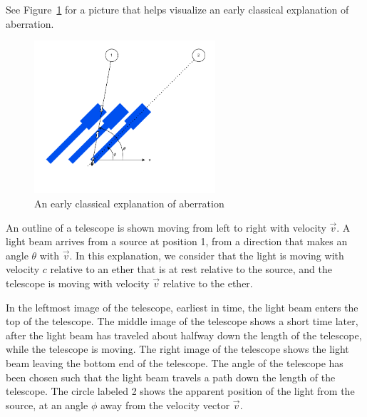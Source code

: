 \documentclass[a4paper]{article}
\theoremstyle{plain}
\theoremstyle{definition}
\newcommand{\vect}[1]{\vec{#1}}
\begin{document}
See Figure~\ref{fig:classical-aberration} for a picture that helps
visualize an early classical explanation of aberration.
\begin{figure}[ht]
	\centering
	\includegraphics[width=0.6\textwidth]{classical-aberration-cropped.pdf}
	\caption{An early classical explanation of aberration}
	\label{fig:classical-aberration}
\end{figure}

An outline of a telescope is shown moving from left to right with
velocity $\vect{v}$.  A light beam arrives from a source at position
1, from a direction that makes an angle $\theta$ with $\vect{v}$.  In
this explanation, we consider that the light is moving with velocity
$c$ relative to an ether that is at rest relative to the source, and
the telescope is moving with velocity $\vect{v}$ relative to the
ether.

In the leftmost image of the telescope, earliest in time, the light
beam enters the top of the telescope.  The middle image of the
telescope shows a short time later, after the light beam has traveled
about halfway down the length of the telescope, while the telescope is
moving.  The right image of the telescope shows the light beam leaving
the bottom end of the telescope.  The angle of the telescope has been
chosen such that the light beam travels a path down the length of the
telescope.  The circle labeled 2 shows the apparent position of the
light from the source, at an angle $\phi$ away from the velocity
vector $\vect{v}$.
\end{document}
